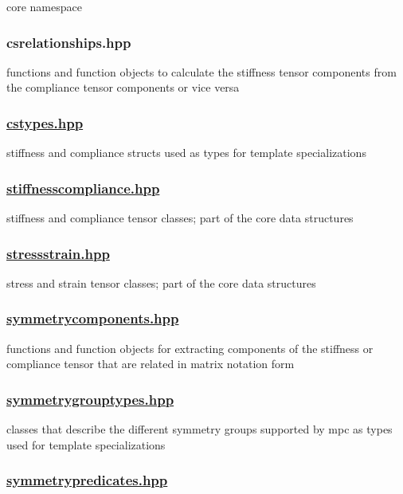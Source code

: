 core namespace

\subsubsection*{csrelationships.\+hpp}

functions and function objects to calculate the stiffness tensor components from the compliance tensor components or vice versa

\subsubsection*{\mbox{\hyperlink{cstypes_8hpp}{cstypes.\+hpp}}}

stiffness and compliance structs used as types for template specializations

\subsubsection*{\mbox{\hyperlink{stiffnesscompliance_8hpp}{stiffnesscompliance.\+hpp}}}

stiffness and compliance tensor classes; part of the core data structures

\subsubsection*{\mbox{\hyperlink{stressstrain_8hpp}{stressstrain.\+hpp}}}

stress and strain tensor classes; part of the core data structures

\subsubsection*{\mbox{\hyperlink{symmetrycomponents_8hpp}{symmetrycomponents.\+hpp}}}

functions and function objects for extracting components of the stiffness or compliance tensor that are related in matrix notation form

\subsubsection*{\mbox{\hyperlink{symmetrygrouptypes_8hpp}{symmetrygrouptypes.\+hpp}}}

classes that describe the different symmetry groups supported by mpc as types used for template specializations

\subsubsection*{\mbox{\hyperlink{symmetrypredicates_8hpp}{symmetrypredicates.\+hpp}}}

